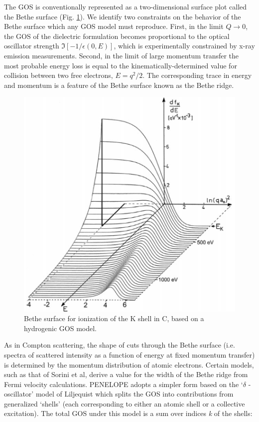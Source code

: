 \documentclass [11pt, proquest, article] {uwthesis}[2016/11/22]
\begin{document}
The GOS is conventionally represented as a two-dimensional surface plot called the Bethe surface (Fig. \ref{fig:bethe}). 
We identify two constraints on the behavior of the Bethe surface which any GOS model must reproduce. First, in the limit $Q\rightarrow 0$, the GOS of the dielectric formulation becomes proportional to  the optical oscillator strength $\Im[-1/\epsilon(0, E)]$, which is experimentally constrained by x-ray emission measurements. Second, in the limit of large momentum transfer the most probable energy loss is equal to the kinematically-determined value for collision between two free electrons, $E = q^2/2$.\cite{sorini2006ab} The corresponding trace in energy and momentum is a feature of the Bethe surface known as the Bethe ridge.

\begin{figure}[h] 
\caption{Bethe surface for ionization of the K shell in C, based on a hydrogenic GOS model.\cite{egerton1979k}}
\label{fig:bethe}
\centering
\includegraphics[scale=0.5]{../Figures/bethe.png}
\end{figure}

As in Compton scattering, the shape of cuts through the Bethe surface (i.e. spectra of scattered intensity as a function of energy at fixed momentum transfer) is determined by the momentum distribution of atomic electrons. Certain models, such as that of Sorini et al, derive a value for the width of the Bethe ridge from Fermi velocity calculations.\cite{sorini2006ab} PENELOPE adopts a simpler form based on the `$\delta$ -oscillator' model of Liljequist which splits the GOS into contributions from generalized `shells' (each corresponding to either an atomic shell or a collective excitation).\cite{liljequist1983simple} The total GOS under this model is a sum over indices \emph{k} of the shells:
\end{document}
